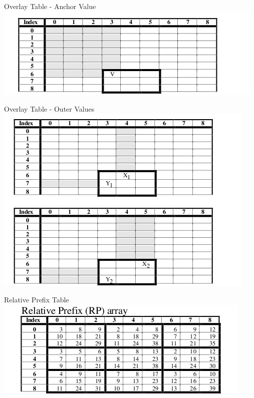\documentclass{beamer}
\theoremstyle{definition}
\theoremstyle{definition}
\begin{document}
\begin{frame}{Overlay Table - Anchor Value}
\includegraphics[scale=0.4]{relprefix_anchor.png}
\cite{Geffner99}
\end{frame}

\begin{frame}{Overlay Table - Outer Values}
\includegraphics[scale=0.4]{relprefix_outer.png}
\cite{Geffner99}
\end{frame}

\begin{frame}{Relative Prefix Table}
\includegraphics[scale=0.4]{relprefix_rp.png}
\cite{Geffner99}
\end{frame}
\end{document}
